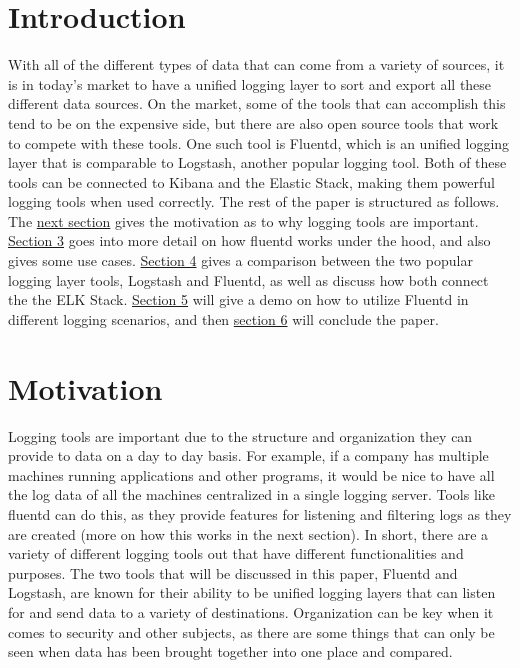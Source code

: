 \section{Introduction} \label{sec: intro}
\quad \quad With all of the different types of data that can come from a variety of sources, it is in today's market
to have a unified logging layer to sort and export all these different data sources. On the market, some
of the tools that can accomplish this tend to be on the expensive side, but there are also open source tools that
work to compete with these tools. One such tool is Fluentd, which is an unified logging layer that is comparable to
Logstash, another popular logging tool. Both of these tools can be connected to Kibana and the Elastic Stack, 
making them powerful logging tools when used correctly. The rest of the paper is structured as follows. The 
\hyperref[sec:motiv]{next section} gives the motivation as to why logging tools are important. 
\hyperref[sec:works]{Section 3} goes into more detail on how fluentd works under the hood, and also gives some
use cases. \hyperref[sec:comp]{Section 4} gives a comparison between the two popular logging layer tools, Logstash 
and Fluentd, as well as discuss how both connect the the ELK Stack. \hyperref[sec:demo]{Section 5} will give a demo on how to 
utilize Fluentd in different logging scenarios, and then \hyperref[sec:conclude]{section 6} will conclude the paper.
\section{Motivation} \label{sec:motiv}
\quad \quad Logging tools are important due to the structure and organization they can provide to data on a day to 
day basis. For example, if a company has multiple machines running applications and other programs, it would be nice 
to have all the log data of all the machines centralized in a single logging server. Tools like fluentd can do this, as 
they provide features for listening and filtering logs as they are created (more on how this works in the next section). 
In short, there are a variety of different logging tools out that have different functionalities and purposes. The two tools
that will be discussed in this paper, Fluentd and Logstash, are known for their ability to be unified logging layers that can
listen for and send data to a variety of destinations. Organization can be key when it comes to security and other subjects,
as there are some things that can only be seen when data has been brought together into one place and compared.
